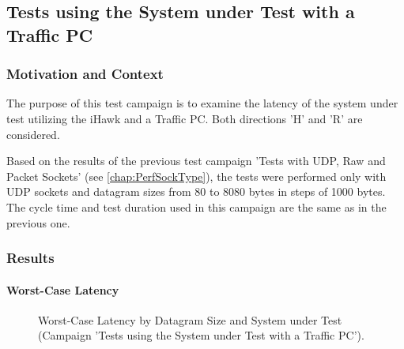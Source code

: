 \subsection{Tests using the System under Test with a Traffic PC}

\subsubsection{Motivation and Context}
The purpose of this test campaign is to examine the latency of the system under test utilizing the iHawk and a Traffic PC. Both directions 'H' and 'R' are considered.

Based on the results of the previous test campaign 'Tests with UDP, Raw and Packet Sockets' (see \ref{chap:PerfSockType}), the tests were performed only with UDP sockets and datagram sizes from 80 to 8080 bytes in steps of 1000 bytes. The cycle time and test duration used in this campaign are the same as in the previous one.

\subsubsection{Results}
\paragraph{Worst-Case Latency}

\begin{figure}[h!]
  \centering
  \caption{Worst-Case Latency by Datagram Size and System under Test (Campaign 'Tests using the System under Test with a Traffic PC').}
  \label{fig:TrafficWc}
\end{figure}


